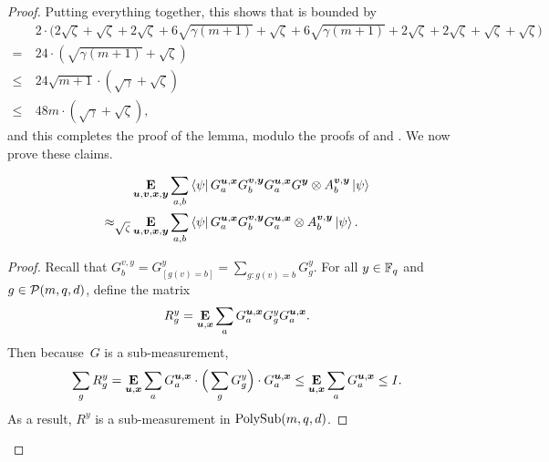 \begin{proof}
Putting everything together, this shows that  is bounded by
\begin{align*}
&2\cdot\Big(2\sqrt{\zeta} + \sqrt{\zeta} + 2\sqrt{\zeta} +6\sqrt{\gamma(m+1)} + \sqrt{\zeta} + 6\sqrt{\gamma(m+1)} + 2\sqrt{\zeta} + 2\sqrt{\zeta} + \sqrt{\zeta} + \sqrt{\zeta}\Big)\\
=~& 24 \cdot(\sqrt{\gamma(m+1)}+\sqrt{\zeta})\\
\leq~& 24\sqrt{m+1} \cdot(\sqrt{\gamma}+\sqrt{\zeta})\\
\leq~& 48 m \cdot (\sqrt{\gamma} + \sqrt{\zeta}),
\end{align*}
and this completes the proof of the lemma, modulo the proofs of   and .
We now prove these claims.

\begin{claim}
\label{clm:g-comm-stability}
\begin{align*}
	&\mathop{\bf E\/}_{\boldsymbol{u},\boldsymbol{v},{\boldsymbol{x}},\boldsymbol{y}} \sum_{a,b} \bra{\psi} G^{\boldsymbol{u},{\boldsymbol{x}}}_a  G^{\boldsymbol{v},\boldsymbol{y}}_b G^{\boldsymbol{u},{\boldsymbol{x}}}_a G^{\boldsymbol{y}}  \otimes A^{\boldsymbol{v},\boldsymbol{y}}_b \ket{\psi} \label{eq:g-comm-stab1} \\
	\approx_{\sqrt{\zeta}}& \mathop{\bf E\/}_{\boldsymbol{u},\boldsymbol{v},{\boldsymbol{x}},\boldsymbol{y}} \sum_{a,b} \bra{\psi} G^{\boldsymbol{u},{\boldsymbol{x}}}_a  G^{\boldsymbol{v},\boldsymbol{y}}_b G^{\boldsymbol{u},{\boldsymbol{x}}}_a  \otimes A^{\boldsymbol{v},\boldsymbol{y}}_b \ket{\psi}.
\end{align*}
\end{claim}
\begin{proof}
	Recall that $G_b^{v,y} = G^y_{[g(v)=b]}= \sum_{g : g(v) = b} G_g^y$. For all $y \in \mathbb F_q$ and $g \in \mathcal{P}(m, q, d)$, define the matrix
	\[
		R^y_g = \mathop{\bf E\/}_{\boldsymbol{u},{\boldsymbol{x}}} \sum_a G^{\boldsymbol{u},{\boldsymbol{x}}}_a G^y_g G^{\boldsymbol{u},{\boldsymbol{x}}}_a.
	\]
	Then because~$G$ is a sub-measurement,
	\begin{equation*}
	\sum_{g} R^y_g
		= \mathop{\bf E\/}_{\boldsymbol{u},{\boldsymbol{x}}} \sum_a G^{\boldsymbol{u},{\boldsymbol{x}}}_a\cdot \Big(\sum_g G^y_g\Big) \cdot G^{\boldsymbol{u},{\boldsymbol{x}}}_a
		\leq\mathop{\bf E\/}_{\boldsymbol{u},{\boldsymbol{x}}} \sum_a G^{\boldsymbol{u},{\boldsymbol{x}}}_a
		\leq I.
	\end{equation*}
	As a result, $R^y$ is a sub-measurement in $\mathrm{PolySub}(m, q, d)$.
	

\end{proof}
\end{proof}
